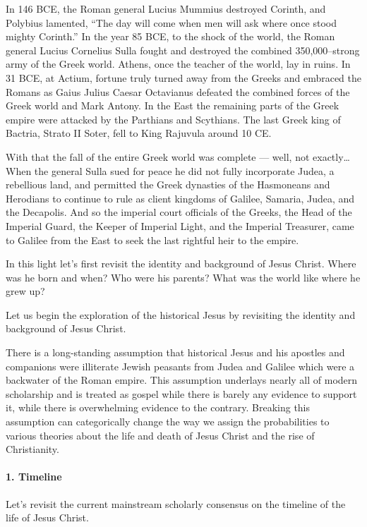 In 146 BCE, the Roman general Lucius Mummius destroyed Corinth, and Polybius lamented, ``The day will come when men will ask where once stood mighty Corinth.''
In the year 85 BCE, to the shock of the world, the Roman general Lucius Cornelius Sulla fought and destroyed the combined 350,000–strong army of the Greek world.
Athens, once the teacher of the world, lay in ruins.
In 31 BCE, at Actium, fortune truly turned away from the Greeks and embraced the Romans as Gaius Julius Caesar Octavianus defeated the combined forces of the Greek world and Mark Antony.
In the East the remaining parts of the Greek empire were attacked by the Parthians and Scythians.
The last Greek king of Bactria, Strato II Soter, fell to King Rajuvula around 10 CE.

With that the fall of the entire Greek world was complete — well, not exactly\ldots{}
When the general Sulla sued for peace he did not fully incorporate Judea, a rebellious land, and permitted the Greek dynasties of the Hasmoneans and Herodians to continue to rule as client kingdoms of Galilee, Samaria, Judea, and the Decapolis.
And so the imperial court officials of the Greeks, the Head of the Imperial Guard, the Keeper of Imperial Light, and the Imperial Treasurer, came to Galilee from the East to seek the last rightful heir to the empire.

In this light let's first revisit the identity and background of Jesus Christ.
Where was he born and when?
Who were his parents?
What was the world like where he grew up?

Let us begin the exploration of the historical Jesus by revisiting the identity and background of Jesus Christ.

There is a long-standing assumption that historical Jesus and his apostles and companions were illiterate Jewish peasants from Judea and Galilee which were a backwater of the Roman empire.
This assumption underlays nearly all of modern scholarship and is treated as gospel while there is barely any evidence to support it, while there is overwhelming evidence to the contrary.
Breaking this assumption can categorically change the way we assign the probabilities to various theories about the life and death of Jesus Christ and the rise of Christianity.

\paragraph{1.
Timeline}\label{par:historical-background}

Let's revisit the current mainstream scholarly consensus on the timeline of the life of Jesus Christ.

